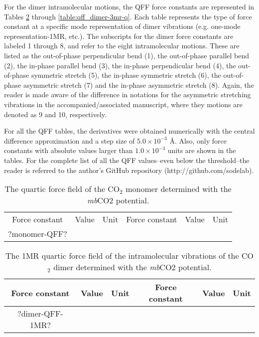 \documentclass[aip,jcp,showpacs,superscriptaddress,groupedaddress]{revtex4-1}  %
\begin{document}
For the dimer intramolecular motions, the QFF force constants are represented in Tables \ref{table:qff_dimer-1mr} through \ref{table:qff_dimer-3mr-q}. Each table represents the type of force constant at a specific mode representation of dimer vibrations (e.g. one-mode representation-1MR, etc.). The subscripts for the dimer force constants are labeled 1 through 8, and refer to the eight intramolecular motions. These are listed as the out-of-phase perpendicular bend (1), the out-of-phase parallel bend (2), the in-phase parallel bend (3), the in-phase perpendicular bend (4), the out-of-phase symmetric stretch (5), the in-phase symmetric stretch (6), the out-of-phase asymmetric stretch (7) and the in-phase asymmetric stretch (8). Again, the reader is made aware of the difference in notations for the asymmetric stretching vibrations in the accompanied/associated manuscript, where they motions are denoted as 9 and 10, respectively. 


For all the QFF tables, the derivatives were obtained numerically with the central difference approximation and a step size of $5.0 \times10^{-3}$ \AA.  Also, only force constants with absolute values larger than $1.0\times10^{-3}$ units are shown in the tables. For the complete list of all the QFF values--even below the threshold--the reader is referred to the author's GitHub repository (http://github.com/sodelab).


\begin{table}[]
\centering
\caption{The quartic force field of the CO$_2$ monomer determined with the \emph{mb}CO2 potential.}
\label{table:qff_monomer}
\begin{ruledtabular}
\begin{tabular}{cccccc}
Force constant & Value        & Unit  & Force constant & Value        & Unit     \\
 ?monomer-QFF?
\end{tabular}
\end{ruledtabular}
\end{table}


\begin{table}[]
\centering
\caption{The 1MR quartic force field of the intramolecular vibrations of the CO$_2$ dimer determined with the \emph{mb}CO2 potential.}
\label{table:qff_dimer-1mr}
\begin{ruledtabular}
\begin{tabular}{cccccc}
Force constant & Value        & Unit  & Force constant & Value        & Unit     \\
\hline \Tstrut
?dimer-QFF-1MR?
\end{tabular}
\end{ruledtabular}
\end{table}
\end{document}
